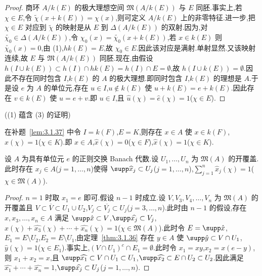 \begin{proof}
商环 $A/k(E)$ 的极大理想空间 $\mathfrak{M}(A/k(E))$ 与 $E$ 同胚.事实上,若 $\chi \in E$,令 $\widetilde{\chi}(x + k(E)) = \chi(x)$,则可定义 $A/k(E)$ 上的非零特征.进一步,把 $\chi \in E$ 对应到 $\widetilde{\chi}$ 的映射是从 $E$ 到 $\Delta(A/k(E))$ 的双射.因为,对 $\widetilde{\chi_{0}} \in \Delta(A/k(E))$,令 $\chi_{0}(x) = \widetilde{\chi_{0}}(x + k(E))$,若 $x \in k(E)$ 则 $\widetilde{\chi_{0}}(x) = 0$,由 (1),$hk(E) = E$,故 $\chi_{0} \in E$.因此该对应是满射.单射显然.又该映射连续,故 $E$ 与 $\mathfrak{M}(A/k(E))$ 同胚.现在,由假设 $h(I \cup k(E)) \subset h(I) \cap hk(E) = h(I) \cap E = \emptyset$,故 $h(I \cup k(E)) = \emptyset$.因此不存在同时包含 $I$,$k(E)$ 的 $A$ 的极大理想.即同时包含 $I$,$k(E)$ 的理想是 $A$.于是设 $e$ 为 $A$ 的单位元,存在 $u \in I$,$u \notin k(E)$ 使 $u + k(E) = e + k(E)$.因此存在 $v \in k(E)$ 使 $u = e + v$.即 $u \in I$,且 $\hat{u}(\chi) = \hat{e}(\chi) = 1$($\chi \in E$).
\end{proof}

((1) 蕴含 (3) 的证明)

在补题~\ref{lem:3.1.37} 中令 $I = k(F)$,$E = K$,则存在 $x \in A$ 使 $x \in k(F)$,$\hat{x}(\chi) = 1$($\chi \in K$).即 $x \in A$,$\hat{x}(\chi) = 0$($\chi \in F$),$\hat{x}(\chi) = 1$($\chi \in K$).

\begin{theorem}\label{thm:3.1.38}
设 $A$ 为具有单位元 $e$ 的正则交换 Banach 代数.设 $U_{1}, \ldots, U_{n}$ 为 $\mathfrak{M}(A)$ 的开覆盖.此时存在 $x_{j} \in A$($j = 1, \ldots, n$)使得 $\supp \widehat{x}_{j} \subset U_{j}$($j = 1, \ldots, n$),$\sum_{j=1}^{n} \widehat{x}_{j}(\chi) = 1$($\chi \in \mathfrak{M}(A)$).
\end{theorem}

\begin{proof}
$n = 1$ 时取 $x_{1} = e$ 即可.假设 $n - 1$ 时成立.设 $V, V_{3}, V_{4}, \ldots, V_{n}$ 为 $\mathfrak{M}(A)$ 的开覆盖且 $V \subset \overline{V} \subset U_{1} \cup U_{2}$,$V_{j} \subset \overline{V_{j}} \subset U_{j}$($j = 3, \ldots, n$).此时由 $n - 1$ 的假设,存在 $x, x_{3}, \ldots, x_{n} \in A$ 满足 $\supp \hat{x} \subset V$,$\supp \widehat{x_{j}} \subset V_{j}$,$\hat{x}(\chi) + \widehat{x_{3}}(\chi) + \cdots + \widehat{x_{n}}(\chi) = 1$($\chi \in \mathfrak{M}(A)$).此时令 $E = \supp \hat{x}$,$E_{1} = E \setminus U_{2}$,$E_{2} = E \setminus U_{1}$,由定理~\ref{thm:3.1.36} 存在 $y \in A$ 使 $\supp \hat{y} \subset V \cap U_{1}$,$\hat{y}(\chi) = 1$($\chi \in E_{1}$).事实上,$(V \cap U_{1})^{c} \cap E_{1} = \emptyset$.此时令 $x_{1} = xy$,$x_{2} = x(e - y)$,则 $x_{1} + x_{2} = x$,且 $\supp \widehat{x_{1}} \subset V \cap U_{1} \subset U_{1}$,$\supp \widehat{x_{2}} \subset E \cap U_{2} \subset U_{2}$.因此满足 $\widehat{x_{1}} + \cdots + \widehat{x_{n}} = 1$,$\supp \widehat{x_{j}} \subset U_{j}$($j = 1, \ldots, n$).
\end{proof}

